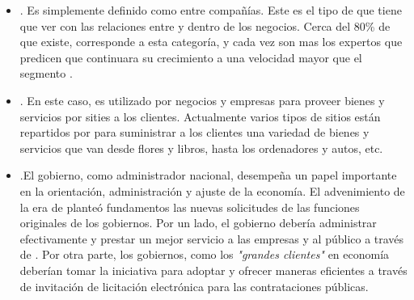 \begin{itemize}
	\item \textbf{\btob}. Es simplemente definido como \ecommerce entre compañías. Este es el tipo de \ecommerce que tiene que ver con las relaciones entre y dentro de los negocios. Cerca del 80\% de \ecommerce que existe, corresponde a esta categoría, y cada vez son mas los expertos que predicen que \btob \ecommerce continuara su crecimiento a una velocidad mayor que el segmento \btoc.


	\item \textbf{\btoc}. En este caso, \internet es utilizado por negocios y empresas para proveer bienes y servicios por sities \webINT a los clientes. Actualmente varios tipos de sitios \webINT \btoc están repartidos por \internet para suministrar a los clientes una variedad de bienes y servicios que van desde flores y libros, hasta los ordenadores y autos, etc.

	\item \textbf{\btog}.El gobierno, como administrador nacional, desempeña un papel importante en la orientación, administración y ajuste de la economía. El advenimiento de la era de \ecommerce planteó fundamentos \ecommerce las nuevas solicitudes de las funciones originales de los gobiernos. Por un lado, el gobierno debería  administrar \emarket efectivamente y prestar un mejor servicio a las empresas y al público a través de \egoverment. Por otra parte, los gobiernos, como los \textit{"grandes clientes"} en economía deberían tomar la iniciativa para adoptar \ecommerce y ofrecer maneras eficientes a través de invitación de licitación electrónica para las contrataciones públicas.



\end{itemize}
